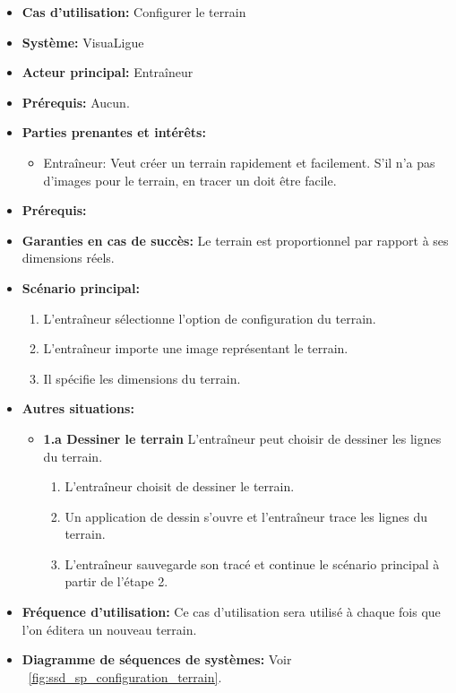 \begin{itemize}
    \item \textbf{Cas d'utilisation:} Configurer le terrain
    \item \textbf{Syst\`eme:} VisuaLigue
    \item \textbf{Acteur principal:} Entra\^ineur
    \item \textbf{Pr\'erequis:} Aucun.
    \item \textbf{Parties prenantes et int\'er\^ets:}
        \begin{itemize}
            \item Entraîneur: Veut créer un terrain rapidement et facilement. S'il n'a pas d'images pour le terrain, en tracer un doit être facile.
        \end{itemize}
    \item \textbf{Pr\'erequis:}
    \item \textbf{Garanties en cas de succ\`es:} Le terrain est proportionnel par rapport à ses dimensions réels.
    \item \textbf{Sc\'enario principal:}
        \begin{enumerate}
        	\item L'entraîneur sélectionne l'option de configuration du terrain.
            \item L'entraîneur importe une image représentant le terrain.
            \item Il spécifie les dimensions du terrain.
        \end{enumerate}
    \item \textbf{Autres situations:}
        \begin{itemize}
            \item \textbf{1.a Dessiner le terrain} L'entraîneur peut choisir de dessiner les lignes du terrain.
                \begin{enumerate}
                    \item L'entraîneur choisit de dessiner le terrain.
                    \item Un application de dessin s'ouvre et l'entraîneur trace les lignes du terrain.
                    \item L'entraîneur sauvegarde son tracé et continue le scénario principal à partir de l'étape 2.
                \end{enumerate}

        \end{itemize}
    \item \textbf{Fréquence d'utilisation:} Ce cas d'utilisation sera utilisé à chaque fois que l'on éditera un nouveau terrain.
    \item \textbf{Diagramme de s\'equences de systèmes:} Voir ~\ref{fig:ssd_sp_configuration_terrain}.
\end{itemize}

